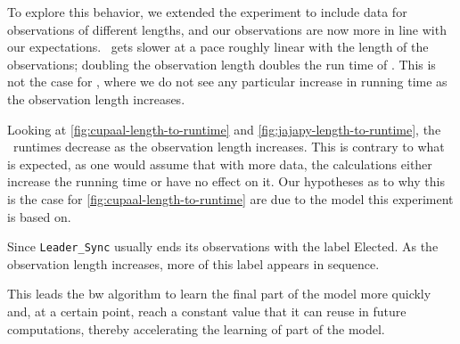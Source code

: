 To explore this behavior, we extended the experiment to include data for observations of different lengths, and our observations are now more in line with our expectations.
\Jajapy\ gets slower at a pace roughly linear with the length of the observations; doubling the observation length doubles the run time of \Jajapy.
This is not the case for \Cupaal, where we do not see any particular increase in running time as the observation length increases.

Looking at \autoref{fig:cupaal-length-to-runtime} and \autoref{fig:jajapy-length-to-runtime}, the \Cupaal\ runtimes decrease as the observation length increases.
This is contrary to what is expected, as one would assume that with more data, the calculations either increase the running time or have no effect on it.
Our hypotheses as to why this is the case for \autoref{fig:cupaal-length-to-runtime} are due to the model this experiment is based on.

Since \texttt{Leader\_Sync} usually ends its observations with the label Elected.
As the observation length increases, more of this label appears in sequence.

This leads the \gls{bw} algorithm to learn the final part of the model more quickly and, at a certain point, reach a constant value that it can reuse in future computations, thereby accelerating the learning of part of the model.


